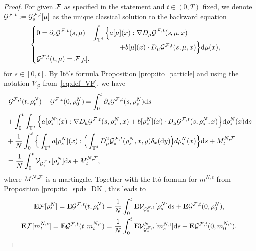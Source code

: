 \begin{proof}
For given $\mathcal{F}$ as specified in the statement and $t \in (0,T)$  fixed, we denote $\mathcal{G}^{\mathcal{F},t} := \mathcal{G}^{\mathcal{F},t}_s[\mu]$ as the unique classical solution to the backward equation
\begin{equation}\label{eq:G^F_equation}
\begin{cases}\displaystyle
0 = \partial_s \mathcal{G}^{\mathcal{F},t}(s,\mu) + \int_{\mathbb{T}^d} \Big\{a[\mu](x) :\nabla D_{\mu}\mathcal{G}^{\mathcal{F},t}(s,\mu,x)\\ \qquad\qquad\qquad\qquad\qquad\qquad + b[\mu](x)\cdot D_{\mu}\mathcal{G}^{\mathcal{F},t}(s,\mu,x)\Big\}\mathrm{d}\mu(x),\\
\mathcal{G}^{\mathcal{F},t}(t,\mu) = \mathcal{F}[\mu],
\end{cases}
\end{equation}
for $s \in [0,t]$. By It\^o's formula Proposition \ref{prop:ito_particle} and using the notation $\mathcal V_{\mathcal G}$ from~\eqref{eq:def_VF}, we have
\begin{align*}
& \ \mathcal{G}^{\mathcal{F},t}(t,\rho_t^N) - \mathcal{G}^{\mathcal{F},t}(0,\rho^N_0) =  \int_0^t\partial_s \mathcal{G}^{\mathcal{F},t}(s,\rho_s^N)\mathrm{d}s \\
& + \int_0^t\int_{\mathbb{T}^d} \Big\{a[\rho_s^N](x) :\nabla D_{\mu}\mathcal{G}^{\mathcal{F},t}(s,\rho_s^N,x) + b[\rho_s^N](x)\cdot D_{\mu}\mathcal{G}^{\mathcal{F},t}(s,\rho_s^N,x)\Big\}\mathrm{d}\rho_s^N(x)\mathrm{d}s\\
 & + \frac{1}{N}\int_0^t \Big\{\int_{\mathbb{T}^d} a[\rho_s^N](x):\Big(\int_{\mathbb{T}^d} D^2_{\mu}\mathcal{G}^{\mathcal{F},t}_s(\rho_s^N, x, y)\delta_x(\mathrm{d}y)\Big) d\rho^N_s(x)\Big\}\mathrm{d}s  +  M^{N,\mathcal{F}}_t\\
 & = \frac{1}{N}\int_0^t \mathcal{V}_{\mathcal{G}^{\mathcal{F},t}_s}[\rho^N_s]\mathrm{d}s  +  M^{N,\mathcal{F}}_t,
\end{align*}
where $M^{N,\mathcal{F}}$ is a martingale. Together with the It\^o formula for $m^{N,\epsilon}$ from Proposition \ref{prop:ito_spde_DK}, this leads to
\begin{equation}\label{eq:kol_1}
\begin{split}
\mathbf{E}\mcl{F}[\rho_t^N] = \mathbf{E}\mcl{G}^{\mcl{F},t}(t,\rho_t^N) & = \frac{1}{N}\int_0^t\mathbf{E}\mcl{V}_{\mcl{G}^{\mcl{F},t}_s}[\rho^N_s]\mathrm{d}s + \mathbf{E}\mcl{G}^{\mcl{F},t}(0,\rho^N_0),\\
   \mathbf{E}\mcl{F}[m_t^{N,\epsilon}] = \mathbf{E}\mcl{G}^{\mcl{F},t}(t,m_t^{N,\epsilon})  & = \frac{1}{N}\int_0^t\mathbf{E}\mcl{V}^N_{\mcl{G}^{\mcl{F},t}_s}[m_s^{N,\epsilon}]\mathrm{d}s + \mathbf{E}\mcl{G}^{\mcl{F},t}(0,m_0^{N,\epsilon}). 

\end{split}
\end{equation}
\end{proof}
